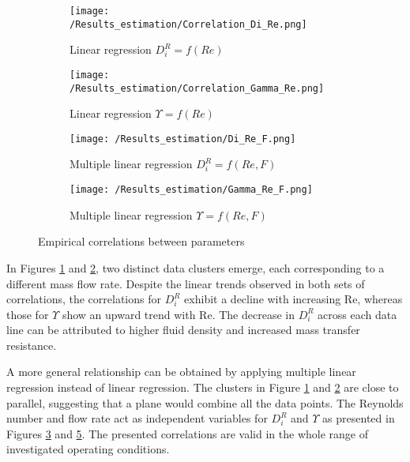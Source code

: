 \documentclass[../Supercritical_fluid_extraction_of_essential_oil_from_chamomile.tex]{subfiles}
\begin{document}
	\begin{figure}[!h]
		\centering
		\begin{subfigure}{0.48\columnwidth}
			\centering
			\texttt{[image: /Results\_estimation/Correlation\_Di\_Re.png]}
			\caption{Linear regression $D_i^R = f(Re)$}
			\label{fig: Correlations_Di_Re}
		\end{subfigure}
		\hfill
		\begin{subfigure}{0.48\columnwidth}
			\centering
			\texttt{[image: /Results\_estimation/Correlation\_Gamma\_Re.png]}
			\caption{Linear regression $\Upsilon = f(Re)$}
			\label{fig: Correlations_Gamma_Re}
		\end{subfigure}
		\hfill
		\begin{subfigure}{0.48\columnwidth}
			\centering
			\texttt{[image: /Results\_estimation/Di\_Re\_F.png]}
			\caption{Multiple linear regression $D_i^R = f(Re, F)$}
			\label{fig: Correlations_Di_Re_F}
		\end{subfigure}
		\hfill
		\begin{subfigure}{0.48\columnwidth}
			\centering
			\texttt{[image: /Results\_estimation/Gamma\_Re\_F.png]}
			\caption{Multiple linear regression $\Upsilon = f(Re, F)$}
			\label{fig: Correlations_Gamma_Re_F}
		\end{subfigure}
		\caption{Empirical correlations between parameters}
	\end{figure}
	
	
	In Figures \ref{fig: Correlations_Di_Re} and \ref{fig: Correlations_Gamma_Re}, two distinct data clusters emerge, each corresponding to a different mass flow rate. Despite the linear trends observed in both sets of correlations, the correlations for $D_i^R$ exhibit a decline with increasing Re, whereas those for $\Upsilon$ show an upward trend with Re. The decrease in $D_i^R$ across each data line can be attributed to higher fluid density and increased mass transfer resistance. %
	
	A more general relationship can be obtained by applying multiple linear regression instead of linear regression. The clusters in Figure \ref{fig: Correlations_Di_Re}  and \ref{fig: Correlations_Gamma_Re} are close to parallel, suggesting that a plane would combine all the data points. The Reynolds number and flow rate act as independent variables for $D_i^R$ and $\Upsilon$ as presented in Figures \ref{fig: Correlations_Di_Re_F} and \ref{fig: Correlations_Gamma_Re_F}. The presented correlations are valid in the whole range of investigated operating conditions.
	
\end{document}
